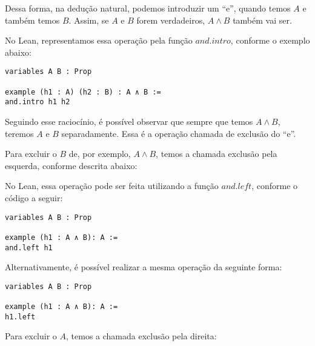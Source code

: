 Dessa forma, na dedução natural, podemos introduzir um ``e'', quando temos $A$ e também temos $B$. Assim, se $A$ e $B$ forem verdadeiros, $A \land B$ também vai ser. 

 \begin{prooftree}
\end{prooftree}

No Lean, representamos essa operação pela função $and.intro$, conforme o exemplo abaixo:
\vspace{5mm}
\begin{lstlisting} 
variables A B : Prop

example (h1 : A) (h2 : B) : A ∧ B :=
and.intro h1 h2
\end{lstlisting}
\vspace{5mm}

Seguindo esse raciocínio, é possível observar que sempre que temos $A \land B$, teremos $A$ e $B$ separadamente. Essa é a operação chamada de exclusão do ``e''.

Para excluir o $B$ de, por exemplo, $A \land B$, temos a chamada exclusão pela esquerda, conforme descrita abaixo:

 \begin{prooftree}
\end{prooftree}

No Lean, essa operação pode ser feita utilizando a função $and.left$, conforme o código a seguir: 
\vspace{5mm}
\begin{lstlisting} 
variables A B : Prop

example (h1 : A ∧ B): A :=
and.left h1
\end{lstlisting}
\vspace{5mm}

Alternativamente, é possível realizar a mesma operação da seguinte forma:
\vspace{5mm}
\begin{lstlisting} 
variables A B : Prop

example (h1 : A ∧ B): A :=
h1.left
\end{lstlisting}
\vspace{5mm}
Para excluir o $A$, temos a chamada exclusão pela direita:

 \begin{prooftree}
\end{prooftree}

